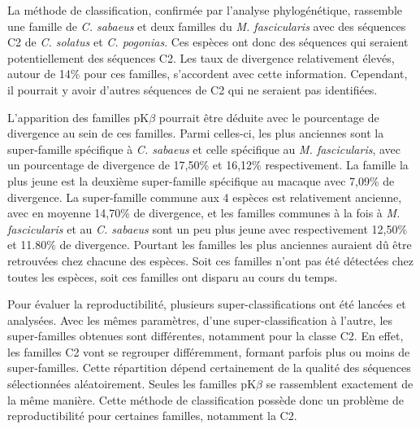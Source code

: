 \documentclass[12pt,a4paper]{article}
\begin{document}
	La méthode de classification, confirmée par l'analyse phylogénétique, rassemble une famille de \textit{C. sabaeus} et deux familles du \textit{M. fascicularis} avec des séquences C2 de \textit{C. solatus} et \textit{C. pogonias}. Ces espèces ont donc des séquences qui seraient potentiellement des séquences C2. Les taux de divergence relativement élevés, autour de 14\% pour ces familles, s'accordent avec cette information. Cependant, il pourrait y avoir d'autres séquences de C2 qui ne seraient pas identifiées. 
	
		L'apparition des familles pK$\beta$ pourrait être déduite avec le pourcentage de divergence au sein de ces familles. Parmi celles-ci, les plus anciennes sont la super-famille spécifique à \textit{C. sabaeus} et celle spécifique au \textit{M. fascicularis}, avec un pourcentage de divergence de 17,50\% et 16,12\% respectivement. La famille la plus jeune est la deuxième super-famille spécifique au macaque avec 7,09\% de divergence.  La super-famille commune aux 4 espèces est relativement ancienne, avec en moyenne 14,70\% de divergence, et les familles communes à la fois à \textit{M. fascicularis} et au \textit{C. sabaeus} sont un peu plus jeune avec respectivement 12,50\% et 11.80\% de divergence. Pourtant les familles les plus anciennes auraient dû être retrouvées chez chacune des espèces. Soit ces familles n'ont pas été détectées chez toutes les espèces, soit ces familles ont disparu au cours du temps.

	Pour évaluer la reproductibilité,  plusieurs super-classifications ont été lancées et analysées. Avec les mêmes paramètres, d'une super-classification à l'autre, les super-familles obtenues sont différentes, notamment pour la classe C2. En effet, les familles C2 vont se regrouper différemment, formant parfois plus ou moins de super-familles. Cette répartition dépend certainement de la qualité des séquences sélectionnées aléatoirement. Seules les familles pK$\beta$ se rassemblent exactement de la même manière. Cette méthode de classification possède donc un problème de reproductibilité pour certaines familles, notamment la C2.  
	
\end{document}
